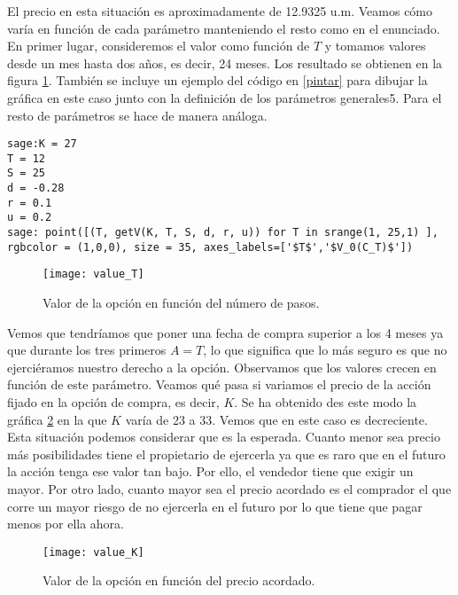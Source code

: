 El precio en esta situación es aproximadamente de 12.9325 u.m. Veamos cómo varía en función de cada parámetro manteniendo el resto como en el enunciado. En primer lugar, consideremos el valor como función de $ T $ y tomamos valores desde un mes hasta dos años, es decir, 24 meses. Los resultado se obtienen en la figura \ref{valueT}. También se incluye un ejemplo del código en \ref{pintar} para dibujar la gráfica en este caso junto con la definición de los parámetros generales5. Para el resto de parámetros se hace de manera análoga. 

\begin{lstlisting}[label={pintar}, caption={Código en Sage para dibujar una gráfica}, morekeywords={sage}]
sage:K = 27
T = 12
S = 25
d = -0.28
r = 0.1
u = 0.2
sage: point([(T, getV(K, T, S, d, r, u)) for T in srange(1, 25,1) ], rgbcolor = (1,0,0), size = 35, axes_labels=['$T$','$V_0(C_T)$'])          	 
\end{lstlisting}

\begin{figure}[h!]
	\centering
	\texttt{[image: value\_T]}
	\caption{Valor de la opción en función del número de pasos.}
	\label{valueT}
\end{figure}

Vemos que tendríamos que poner una fecha de compra superior a los 4 meses ya que durante los tres primeros $ A = T $, lo que significa que lo más seguro es que no ejerciéramos nuestro derecho a la opción. Observamos que los valores crecen en función de este parámetro. Veamos qué pasa si variamos el precio de la acción fijado en la opción de compra, es decir, $ K $. Se ha obtenido des este modo la gráfica \ref{valueK} en la que $ K $ varía de 23 a 33. Vemos que en este caso es decreciente. Esta situación podemos considerar que es la esperada. Cuanto menor sea precio más posibilidades tiene el propietario de ejercerla ya que es raro que en el futuro la acción tenga ese valor tan bajo. Por ello, el vendedor tiene que exigir un mayor. Por otro lado, cuanto mayor sea el precio acordado es el comprador el que corre un mayor riesgo de no ejercerla en el futuro por lo que tiene que pagar menos por ella ahora. 

\begin{figure}[h!]
	\centering
	\texttt{[image: value\_K]}
	\caption{Valor de la opción en función del precio acordado.}
	\label{valueK}
\end{figure} 

